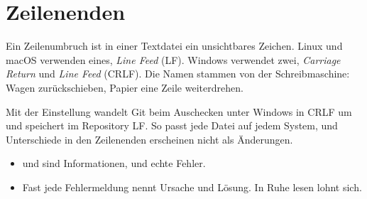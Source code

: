 \section{Zeilenenden}
\label{sec:zeilenenden}

Ein Zeilenumbruch ist in einer Textdatei ein unsichtbares Zeichen. Linux und macOS
verwenden eines, \emph{Line Feed} (LF). Windows verwendet zwei, \emph{Carriage Return} und
\emph{Line Feed} (CRLF). Die Namen stammen von der Schreibmaschine: Wagen zurückschieben,
Papier eine Zeile weiterdrehen.

Mit der Einstellung  wandelt Git beim Auschecken unter Windows in
CRLF um und speichert im Repository LF. So passt jede Datei auf jedem System, und
Unterschiede in den Zeilenenden erscheinen nicht als Änderungen.

\begin{zusammenfassung}
\begin{itemize}[nosep]
  \item {} und  sind Informationen,  und  echte Fehler.
  \item Fast jede Fehlermeldung nennt Ursache und Lösung. In Ruhe lesen lohnt sich.
\end{itemize}
\end{zusammenfassung}
